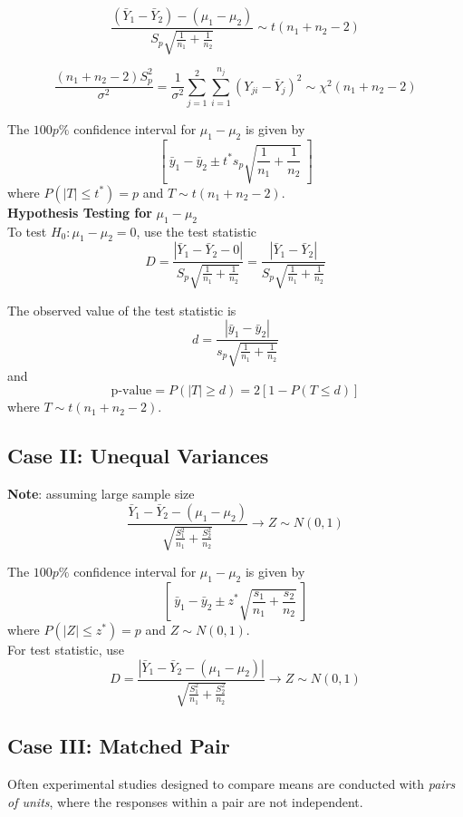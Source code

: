 \documentclass[12pt, leqno]{article}
\theoremstyle{definition}
\begin{document}
  $$\frac{(\bar{Y}_{1} - \bar{Y}_{2}) - (\mu_{1} - \mu_{2})}
  {S_{p}\sqrt{\frac{1}{n_{1}} + \frac{1}{n_{2}}}} \sim t(n_{1} + n_{2} - 2)$$

  $$\frac{(n_{1} + n_{2} - 2)S_{p}^{2}}{\sigma^2} =
  \frac{1}{\sigma^2}\sum_{j=1}^{2}\sum_{i=1}^{n_{j}}(Y_{ji} - \bar{Y}_{j})^{2} \sim
  \chi^{2}(n_{1} + n_{2} - 2)$$

  The $100p\%$ confidence interval for $\mu_{1} - \mu_{2}$ is given by
  $$\left[~\bar{y}_1 - \bar{y}_2 \pm t^{*}s_{p}\sqrt{\frac{1}{n_{1}} + \frac{1}{n_{2}}}~\right]$$
  where $P(|T| \leq t^{*}) = p$ and $T \sim t(n_{1} + n_{2} - 2)$. \\

  \textbf{Hypothesis Testing for} $\mu_{1} - \mu_{2}$ \\
  To test $H_{0} : \mu_{1} - \mu_{2} = 0$, use the test statistic
  $$D = \frac{|\bar{Y}_{1} - \bar{Y}_{2} - 0|}{S_{p}\sqrt{\frac{1}{n_{1}} + \frac{1}{n_{2}}}}
  = \frac{|\bar{Y}_{1} - \bar{Y}_{2}|}{S_{p}\sqrt{\frac{1}{n_{1}} + \frac{1}{n_{2}}}}$$

  The observed value of the test statistic is
  $$d = \frac{|\bar{y}_{1} - \bar{y}_{2}|}{s_{p}\sqrt{\frac{1}{n_{1}} + \frac{1}{n_{2}}}}$$
  and
  $$\text{p-value} = P(|T| \geq d) = 2[1 - P(T \leq d)]$$
  where $T \sim t(n_{1} + n_{2} - 2)$.

  \subsection{Case II: Unequal Variances}
  \textbf{Note}: assuming large sample size
  $$\frac{\bar{Y}_{1} - \bar{Y}_{2} - (\mu_{1} - \mu_{2})}
  {\sqrt{\frac{S_{1}^{2}}{n_{1}} + \frac{S_{2}^{2}}{n_{2}}}}
  \rightarrow Z \sim N(0, 1)$$

  The $100p\%$ confidence interval for $\mu_{1} - \mu_{2}$ is given by
  $$\left[~\bar{y}_1 - \bar{y}_2 \pm z^{*}\sqrt{\frac{s_1}{n_{1}} + \frac{s_2}{n_{2}}}~\right]$$
  where $P(|Z| \leq z^{*}) = p$ and $Z \sim N(0, 1)$. \\

  For test statistic, use
  $$D = \frac{|\bar{Y}_{1} - \bar{Y}_{2} - (\mu_{1} - \mu_{2})|}
  {\sqrt{\frac{S_{1}^{2}}{n_{1}} + \frac{S_{2}^{2}}{n_{2}}}}
  \rightarrow Z \sim N(0, 1)$$

  \subsection{Case III: Matched Pair}
  Often experimental studies designed to compare means are conducted with \emph{pairs of units}, where the responses within a pair are not independent. \\
\end{document}
